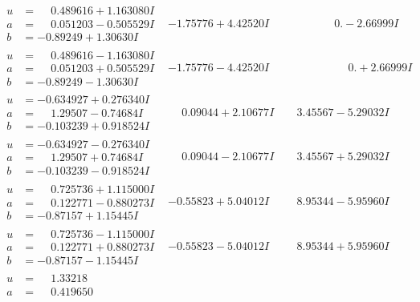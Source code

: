 \documentclass[1p]{elsarticle_modified}
\theoremstyle{definition}
\begin{document}
$$\begin{array}{c|c|c}
\begin{aligned}
u &= \phantom{-}0.489616 + 1.163080 I \\
a &= \phantom{-}0.051203 - 0.505529 I \\
b &= -0.89249 + 1.30630 I\end{aligned}
 & -1.75776 + 4.42520 I & \phantom{-0.000000 } 0. - 2.66999 I \\ \hline\begin{aligned}
u &= \phantom{-}0.489616 - 1.163080 I \\
a &= \phantom{-}0.051203 + 0.505529 I \\
b &= -0.89249 - 1.30630 I\end{aligned}
 & -1.75776 - 4.42520 I & \phantom{-0.000000 -}0. + 2.66999 I \\ \hline\begin{aligned}
u &= -0.634927 + 0.276340 I \\
a &= \phantom{-}1.29507 - 0.74684 I \\
b &= -0.103239 + 0.918524 I\end{aligned}
 & \phantom{-}0.09044 + 2.10677 I & \phantom{-}3.45567 - 5.29032 I \\ \hline\begin{aligned}
u &= -0.634927 - 0.276340 I \\
a &= \phantom{-}1.29507 + 0.74684 I \\
b &= -0.103239 - 0.918524 I\end{aligned}
 & \phantom{-}0.09044 - 2.10677 I & \phantom{-}3.45567 + 5.29032 I \\ \hline\begin{aligned}
u &= \phantom{-}0.725736 + 1.115000 I \\
a &= \phantom{-}0.122771 - 0.880273 I \\
b &= -0.87157 + 1.15445 I\end{aligned}
 & -0.55823 + 5.04012 I & \phantom{-}8.95344 - 5.95960 I \\ \hline\begin{aligned}
u &= \phantom{-}0.725736 - 1.115000 I \\
a &= \phantom{-}0.122771 + 0.880273 I \\
b &= -0.87157 - 1.15445 I\end{aligned}
 & -0.55823 - 5.04012 I & \phantom{-}8.95344 + 5.95960 I \\ \hline\begin{aligned}
u &= \phantom{-}1.33218\phantom{ +0.000000I} \\
a &= \phantom{-}0.419650\phantom{ +0.000000I} \\

\end{aligned}
\end{array}$$
\end{document}
